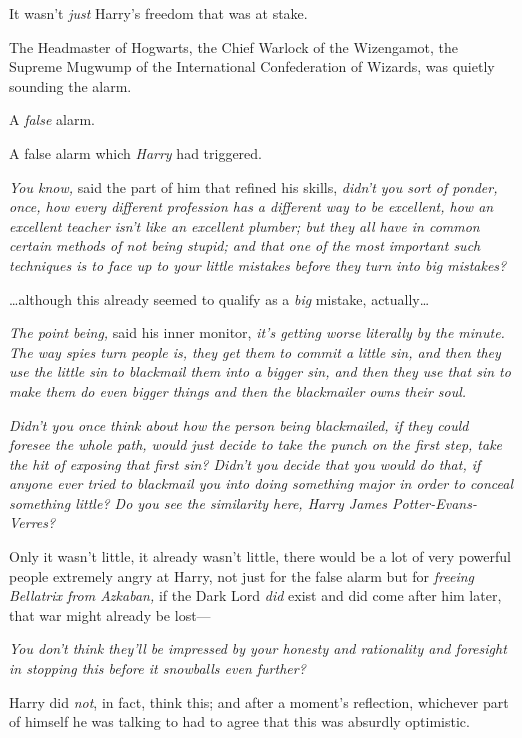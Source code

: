 It wasn't \emph{just} Harry's freedom that was at stake.

The Headmaster of Hogwarts, the Chief Warlock of the Wizengamot, the Supreme Mugwump of the International Confederation of Wizards, was quietly sounding the alarm.

A \emph{false} alarm.

A false alarm which \emph{Harry} had triggered.

\emph{You know,} said the part of him that refined his skills, \emph{didn't you sort of ponder, once, how every different profession has a different way to be excellent, how an excellent teacher isn't like an excellent plumber; but they all have in common certain methods of not being stupid; and that one of the most important such techniques is to face up to your little mistakes before they turn into \emph{big} mistakes?}

{\ldots}although this already seemed to qualify as a \emph{big} mistake, actually{\ldots}

\emph{The point being,} said his inner monitor, \emph{it's getting worse literally by the minute. The way spies turn people is, they get them to commit a little sin, and then they use the little sin to blackmail them into a bigger sin, and then they use \emph{that} sin to make them do even bigger things and then the blackmailer owns their soul.}

\emph{Didn't you once think about how the person being blackmailed, if they could foresee the whole path, would just decide to take the punch on the first step, take the hit of exposing that first sin? Didn't you decide that you would do that, if anyone ever tried to blackmail you into doing something major in order to conceal something little? Do you see the similarity here, Harry James Potter-Evans-Verres?}

Only it wasn't little, it already wasn't little, there would be a lot of very powerful people extremely angry at Harry, not just for the false alarm but for \emph{freeing Bellatrix from Azkaban,} if the Dark Lord \emph{did} exist and did come after him later, that war might already be lost—

\emph{You don't think they'll be impressed by your honesty and rationality and foresight in stopping this before it snowballs even further?}

Harry did \emph{not}, in fact, think this; and after a moment's reflection, whichever part of himself he was talking to had to agree that this was absurdly optimistic.

